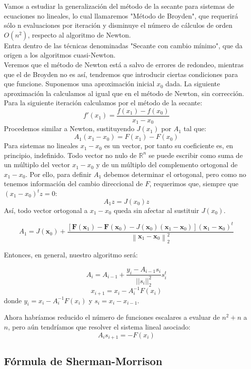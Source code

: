Vamos a estudiar la generalización del método de la secante para sistemas de ecuaciones no lineales, lo cual llamaremos "Método de Broyden", que requerirá sólo n evaluaciones por iteración y disminuye el número de cálculos de orden $O(n^2)$, respecto al algoritmo de Newton.\\
Entra dentro de las técnicas denominadas "Secante con cambio mínimo", que da origen a los algoritmos cuasi-Newton.\\
Veremos que el método de Newton está a salvo de errores de redondeo, mientras que el de Broyden no es así, tendremos que introducir ciertas condiciones para que funcione. 
Suponemos una aproximación inicial $x_0$ dada. La siguiente aproximación la calculamos al igual que en el método de Newton, sin corrección.
Para la siguiente iteración calculamos por el método de la secante:
\[f'(x_1) = \frac{f(x_1)-f(x_0)}{x_1-x_0}\]
Procedemos similar a Newton, sustituyendo $J(x_{1})$ por $A_1$ tal que:
\[A_1(x_{1}-x_{0}) = F(x_{1})-F(x_{0})\]
Para sistemas no lineales $x_1 - x_0$ es un vector, por tanto su coeficiente es, en principio, indefinido. Todo vector no nulo de $\mathbb{R}^n$ se puede escribir como suma de un múltiplo del vector $x_{1}-x_{0}$ y de un múltiplo del complemento ortogonal de $x_{1}-x_{0}$. Por ello, para definir $A_1$ debemos determinar el ortogonal, pero como no tenemos información del cambio direccional de $F$, requerimos que, siempre que $(x_{1}-x_{0})^t z = 0$:
\[A_1 z = J(x_{0}) z\]
Así, todo vector ortogonal a $x_{1}-x_{0}$ queda sin afectar al sustituir $J(x_{0})$.

\[A_{1}=J\left(\mathbf{x}_{0}\right)+\frac{\left[\mathbf{F}\left(\mathbf{x}_{1}\right)-\mathbf{F}\left(\mathbf{x}_{0}\right)-J\left(\mathbf{x}_{0}\right)\left(\mathbf{x}_{1}-\mathbf{x}_{0}\right)\right]\left(\mathbf{x}_{1}-\mathbf{x}_{0}\right)^{t}}{\left\|\mathbf{x}_{1}-\mathbf{x}_{0}\right\|_{2}^{2}}\]

Entonces, en general, nuestro algoritmo será:

\begin{equation}\label{SM}
A_i = A_{i-1} + \frac{y_i-A_{i-1} s_i}{||s_i||^2_2}s^t_i
\end{equation}
\[x_{i+1} = x_{i}-A_i^{-1} F(x_{i})\]
donde $y_i = x_i-A_i^{-1}F(x_{i})$ y $s_i = x_{i} - x_{i-1}$.

Ahora habríamos reducido el número de funciones escalares a evaluar de $n^2+n$ a $n$, pero aún tendríamos que resolver el sistema lineal asociado:
\[A_i s_{i+1} = -F(x_{i}) \]

\subsection{Fórmula de Sherman-Morrison}

